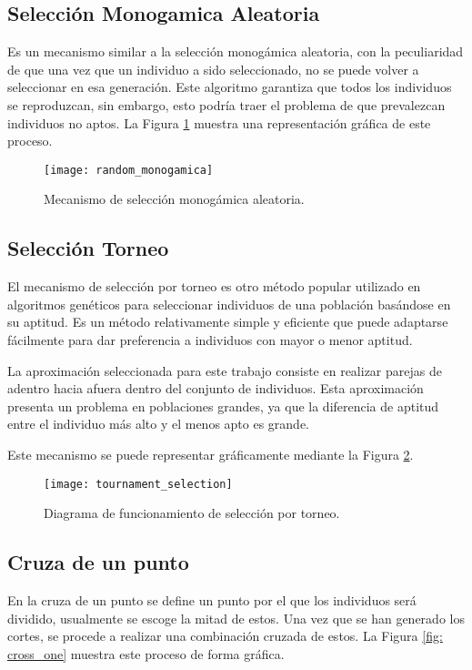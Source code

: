 \subsection{Selección Monogamica Aleatoria}
Es un mecanismo similar a la selección monogámica aleatoria, con la peculiaridad de que una vez que un individuo a sido seleccionado, no se puede volver a seleccionar en esa generación. Este algoritmo garantiza que todos los individuos se reproduzcan, sin embargo, esto podría traer el problema de que prevalezcan individuos no aptos. La Figura \ref{fig: selection_mono} muestra una representación gráfica de este proceso.

\begin{figure}[htbp]
	\centering
	\texttt{[image: random\_monogamica]}
	\caption{Mecanismo de selección monogámica aleatoria.}
	\label{fig: selection_mono}
\end{figure}


\subsection{Selección Torneo}
El mecanismo de selección por torneo es otro método popular utilizado en algoritmos genéticos para seleccionar individuos de una población basándose en su aptitud. Es un método relativamente simple y eficiente que puede adaptarse fácilmente para dar preferencia a individuos con mayor o menor aptitud.

La aproximación seleccionada para este trabajo consiste en realizar parejas de adentro hacia afuera dentro del conjunto de individuos. Esta aproximación presenta un problema en poblaciones grandes, ya que la diferencia de aptitud entre el individuo más alto y el menos apto es grande.

Este mecanismo se puede representar gráficamente mediante la Figura \ref{fig:TS}.

\begin{figure}[htbp]
	\centering
	\texttt{[image: tournament\_selection]}
	\caption{Diagrama de funcionamiento de selección por torneo.}
	\label{fig:TS}
\end{figure}


\FloatBarrier
\subsection{Cruza de un punto}
En la cruza de un punto se define un punto por el que los individuos será dividido, usualmente se escoge la mitad de estos. Una vez que se han generado los cortes, se procede a realizar una combinación cruzada de estos. La Figura \ref{fig: cross_one} muestra este proceso de forma gráfica.

